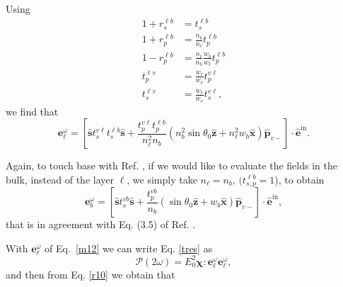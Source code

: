 \documentclass[aps,11pt]{revtex4}
\begin{document}
Using 
\begin{align}
1 + r^{\ell b}_{s} &= t^{\ell b}_{s}\nonumber\\
1 + r^{\ell b}_{p}
&= \frac{n_b}{n_\ell}
t^{\ell b}_{p} 
\nonumber\\
1 - r^{\ell b}_{p}
&= \frac{n_\ell}{n_b}
   \frac{w_{b}}{w_{\ell}}t^{\ell b}_{p}\\
t^{\ell v}_{p} &= \frac{w_{\ell}}{w_{v}}t^{v\ell}_{p}\nonumber\\
t^{\ell v}_{s} &= \frac{w_{\ell}}{w_{v}}t^{v\ell}_{s}\nonumber 
,
\end{align}
we find that
\begin{equation}\label{m12}
\mathbf{e}^{\omega}_{\ell}
= \left[
\hat{\mathbf{s}}t_{s}^{v\ell}t_{s}^{\ell b}\hat{\mathbf{s}} 
+ \frac{t^{v\ell}_{p}t^{\ell b}_{p}}
       {n^2_\ell n_b}
\left(
  n^2_b
\sin\theta_0\hat{\mathbf{z}}
+ n^2_\ell w_b\hat{\mathbf{x}}
\right)
\hat{\mathbf{p}}_{v-}
\right]
\cdot\hat{\mathbf{e}}^{\mathrm{in}}.  
\end{equation}  

Again, to touch base with Ref. \cite{mizrahiJOSA88},
if we would like to evaluate the fields in the bulk, instead of the layer
$\ell$, we simply take 
$n_\ell=n_b,\,(t^{\ell b}_{s,p}=1$), to obtain
\begin{equation}\label{m13}
\mathbf{e}^{\omega}_{b}
= \left[
\hat{\mathbf{s}}t_{s}^{vb}\hat{\mathbf{s}}
+ \frac{t^{vb}_{p}}{n_b}
\left(
\sin\theta_0\hat{\mathbf{z}} + w_b\hat{\mathbf{x}}
\right) 
\hat{\mathbf{p}}_{v-}
\right]
\cdot\hat{\mathbf{e}}^{\mathrm{in}},  
\end{equation} 
that is in agreement with Eq. (3.5) of Ref. \cite{mizrahiJOSA88}.

With $\mathbf{e}^{\omega}_\ell$ of Eq.~\eqref{m12}
 we can write Eq. \eqref{tres} as
\begin{equation}\label{m4}
\boldsymbol{\mathcal{P}}(2\omega) = E^{2}_{0}\boldsymbol{\chi}:
\mathbf{e}^{\omega}_{\ell}\mathbf{e}^{\omega}_{\ell}
,
\end{equation}
and then from Eq. \eqref{r10} we obtain that
\end{document}
